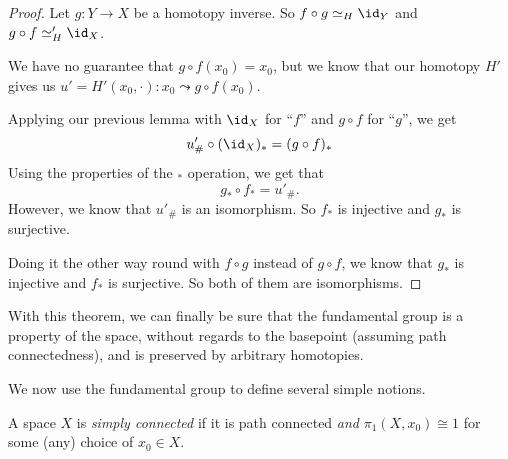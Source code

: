 \documentclass[a4paper]{article}
\begin{document}
\begin{proof}
  Let $g: Y\to X$ be a homotopy inverse. So $f\circ g\simeq_H \id_Y$ and $g\circ f\simeq_H' \id_X$.
  \begin{center}
  \end{center}
  We have no guarantee that $g\circ f(x_0) = x_0$, but we know that our homotopy $H'$ gives us $u' = H'(x_0, \cdot): x_0 \leadsto g\circ f(x_0)$.

  Applying our previous lemma with $\id_X$ for ``$f$'' and $g \circ f$ for ``$g$'', we get
  \[
    u'_\# \circ (\id_X)_* = (g\circ f)_*
  \]
  Using the properties of the $_*$ operation, we get that
  \[
    g_*\circ f_* = u'_\#.
  \]
  However, we know that $u'_\#$ is an isomorphism. So $f_*$ is injective and $g_*$ is surjective.

  Doing it the other way round with $f\circ g$ instead of $g\circ f$, we know that $g_*$ is injective and $f_*$ is surjective. So both of them are isomorphisms.
\end{proof}
With this theorem, we can finally be sure that the fundamental group is a property of the space, without regards to the basepoint (assuming path connectedness), and is preserved by arbitrary homotopies.

We now use the fundamental group to define several simple notions.
\begin{defi}
  A space $X$ is \emph{simply connected} if it is path connected \emph{and} $\pi_1(X, x_0) \cong 1$ for some (any) choice of $x_0 \in X$.
\end{defi}
\end{document}
